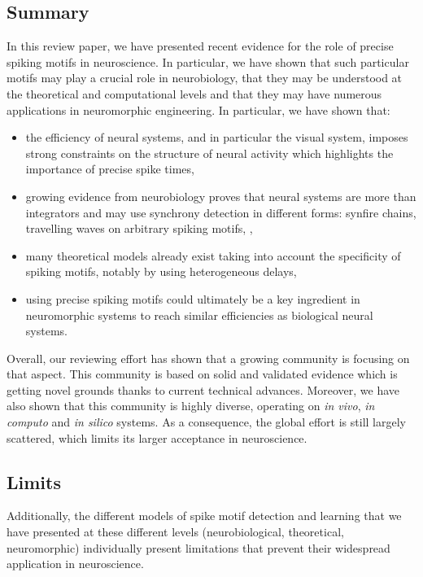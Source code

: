 \documentclass[brainsci, %
               review,submit,pdftex,moreauthors
               ]{Definitions/mdpi}
\begin{document}
\subsection{Summary}
In this review paper, we have presented recent evidence for the role of precise spiking motifs in neuroscience. In particular, we have shown that such particular motifs may play a crucial role in neurobiology, that they may be understood at the theoretical and computational levels and that they may have numerous applications in neuromorphic engineering. In particular, we have shown that:
\begin{itemize}
  \item  the efficiency of neural systems, and in particular the visual system, imposes strong constraints on the structure of neural activity which highlights the importance of precise spike times,
  \item  growing evidence from neurobiology proves that neural systems are more than integrators and may use synchrony detection in different forms: synfire chains, travelling waves on arbitrary spiking motifs, ,
  \item  many theoretical models already exist taking into account the specificity of spiking motifs, notably by using heterogeneous delays,
  \item  using precise spiking motifs could ultimately be a key ingredient in neuromorphic systems to reach similar efficiencies as biological neural systems.
\end{itemize}
 Overall, our reviewing effort has shown that a growing community is focusing on that aspect. This community is based on solid and validated evidence which is getting novel grounds thanks to current technical advances. Moreover, we have also shown that this community is highly diverse, operating on \emph{in vivo}, \emph{in computo} and \emph{in silico} systems. As a consequence, the global effort is still largely scattered, which limits its larger acceptance in neuroscience. 

\subsection{Limits}
Additionally, the different models of spike motif detection and learning that we have presented at these different levels (neurobiological, theoretical, neuromorphic) individually present limitations that prevent their widespread application in neuroscience.
\end{document}
